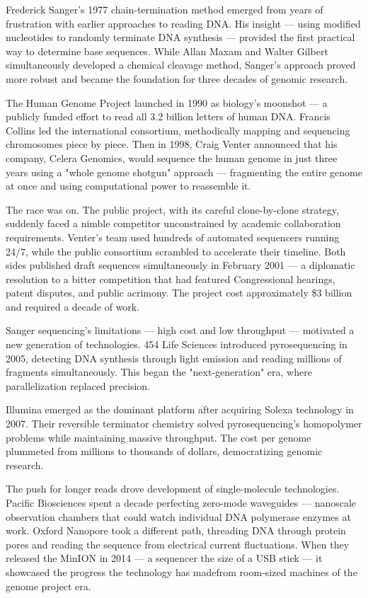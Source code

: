\begin{historical}
Frederick Sanger's 1977 chain-termination method emerged from years of frustration with earlier approaches to reading DNA. His insight — using modified nucleotides to randomly terminate DNA synthesis — provided the first practical way to determine base sequences. While Allan Maxam and Walter Gilbert simultaneously developed a chemical cleavage method, Sanger's approach proved more robust and became the foundation for three decades of genomic research.

The Human Genome Project launched in 1990 as biology's moonshot — a publicly funded effort to read all 3.2 billion letters of human DNA. Francis Collins led the international consortium, methodically mapping and sequencing chromosomes piece by piece. Then in 1998, Craig Venter announced that his company, Celera Genomics, would sequence the human genome in just three years using a "whole genome shotgun" approach — fragmenting the entire genome at once and using computational power to reassemble it.

The race was on. The public project, with its careful clone-by-clone strategy, suddenly faced a nimble competitor unconstrained by academic collaboration requirements. Venter's team used hundreds of automated sequencers running 24/7, while the public consortium scrambled to accelerate their timeline. Both sides published draft sequences simultaneously in February 2001 — a diplomatic resolution to a bitter competition that had featured Congressional hearings, patent disputes, and public acrimony. The project cost approximately \$3 billion and required a decade of work.

Sanger sequencing's limitations — high cost and low throughput — motivated a new generation of technologies. 454 Life Sciences introduced pyrosequencing in 2005, detecting DNA synthesis through light emission and reading millions of fragments simultaneously. This began the "next-generation" era, where parallelization replaced precision.

Illumina emerged as the dominant platform after acquiring Solexa technology in 2007. Their reversible terminator chemistry solved pyrosequencing's homopolymer problems while maintaining massive throughput. The cost per genome plummeted from millions to thousands of dollars, democratizing genomic research.

The push for longer reads drove development of single-molecule technologies. Pacific Biosciences spent a decade perfecting zero-mode waveguides — nanoscale observation chambers that could watch individual DNA polymerase enzymes at work. Oxford Nanopore took a different path, threading DNA through protein pores and reading the sequence from electrical current fluctuations. When they released the MinION in 2014 — a sequencer the size of a USB stick — it showcased the progress the technology has madefrom room-sized machines of the genome project era.


\end{historical}
